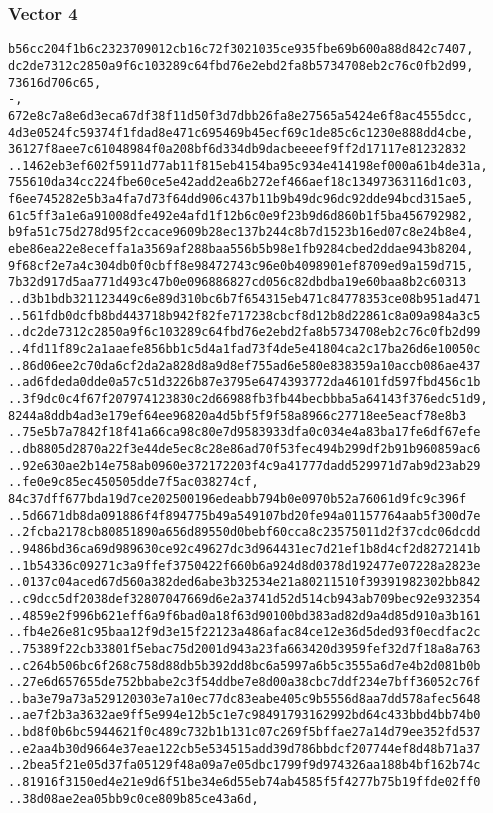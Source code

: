 \documentclass[
]{article}
\begin{document}
\hypertarget{vector-4-2}{%
\subsubsection{Vector 4}\label{vector-4-2}}

\begin{verbatim}
b56cc204f1b6c2323709012cb16c72f3021035ce935fbe69b600a88d842c7407,
dc2de7312c2850a9f6c103289c64fbd76e2ebd2fa8b5734708eb2c76c0fb2d99,
73616d706c65,
-,
672e8c7a8e6d3eca67df38f11d50f3d7dbb26fa8e27565a5424e6f8ac4555dcc,
4d3e0524fc59374f1fdad8e471c695469b45ecf69c1de85c6c1230e888dd4cbe,
36127f8aee7c61048984f0a208bf6d334db9dacbeeeef9ff2d17117e81232832
..1462eb3ef602f5911d77ab11f815eb4154ba95c934e414198ef000a61b4de31a,
755610da34cc224fbe60ce5e42add2ea6b272ef466aef18c13497363116d1c03,
f6ee745282e5b3a4fa7d73f64dd906c437b11b9b49dc96dc92dde94bcd315ae5,
61c5ff3a1e6a91008dfe492e4afd1f12b6c0e9f23b9d6d860b1f5ba456792982,
b9fa51c75d278d95f2ccace9609b28ec137b244c8b7d1523b16ed07c8e24b8e4,
ebe86ea22e8eceffa1a3569af288baa556b5b98e1fb9284cbed2ddae943b8204,
9f68cf2e7a4c304db0f0cbff8e98472743c96e0b4098901ef8709ed9a159d715,
7b32d917d5aa771d493c47b0e096886827cd056c82dbdba19e60baa8b2c60313
..d3b1bdb321123449c6e89d310bc6b7f654315eb471c84778353ce08b951ad471
..561fdb0dcfb8bd443718b942f82fe717238cbcf8d12b8d22861c8a09a984a3c5
..dc2de7312c2850a9f6c103289c64fbd76e2ebd2fa8b5734708eb2c76c0fb2d99
..4fd11f89c2a1aaefe856bb1c5d4a1fad73f4de5e41804ca2c17ba26d6e10050c
..86d06ee2c70da6cf2da2a828d8a9d8ef755ad6e580e838359a10accb086ae437
..ad6fdeda0dde0a57c51d3226b87e3795e6474393772da46101fd597fbd456c1b
..3f9dc0c4f67f207974123830c2d66988fb3fb44becbbba5a64143f376edc51d9,
8244a8ddb4ad3e179ef64ee96820a4d5bf5f9f58a8966c27718ee5eacf78e8b3
..75e5b7a7842f18f41a66ca98c80e7d9583933dfa0c034e4a83ba17fe6df67efe
..db8805d2870a22f3e44de5ec8c28e86ad70f53fec494b299df2b91b960859ac6
..92e630ae2b14e758ab0960e372172203f4c9a41777dadd529971d7ab9d23ab29
..fe0e9c85ec450505dde7f5ac038274cf,
84c37dff677bda19d7ce202500196edeabb794b0e0970b52a76061d9fc9c396f
..5d6671db8da091886f4f894775b49a549107bd20fe94a01157764aab5f300d7e
..2fcba2178cb80851890a656d89550d0bebf60cca8c23575011d2f37cdc06dcdd
..9486bd36ca69d989630ce92c49627dc3d964431ec7d21ef1b8d4cf2d8272141b
..1b54336c09271c3a9ffef3750422f660b6a924d8d0378d192477e07228a2823e
..0137c04aced67d560a382ded6abe3b32534e21a80211510f39391982302bb842
..c9dcc5df2038def32807047669d6e2a3741d52d514cb943ab709bec92e932354
..4859e2f996b621eff6a9f6bad0a18f63d90100bd383ad82d9a4d85d910a3b161
..fb4e26e81c95baa12f9d3e15f22123a486afac84ce12e36d5ded93f0ecdfac2c
..75389f22cb33801f5ebac75d2001d943a23fa663420d3959fef32d7f18a8a763
..c264b506bc6f268c758d88db5b392dd8bc6a5997a6b5c3555a6d7e4b2d081b0b
..27e6d657655de752bbabe2c3f54ddbe7e8d00a38cbc7ddf234e7bff36052c76f
..ba3e79a73a529120303e7a10ec77dc83eabe405c9b5556d8aa7dd578afec5648
..ae7f2b3a3632ae9ff5e994e12b5c1e7c98491793162992bd64c433bbd4bb74b0
..bd8f0b6bc5944621f0c489c732b1b131c07c269f5bffae27a14d79ee352fd537
..e2aa4b30d9664e37eae122cb5e534515add39d786bbdcf207744ef8d48b71a37
..2bea5f21e05d37fa05129f48a09a7e05dbc1799f9d974326aa188b4bf162b74c
..81916f3150ed4e21e9d6f51be34e6d55eb74ab4585f5f4277b75b19ffde02ff0
..38d08ae2ea05bb9c0ce809b85ce43a6d,
\end{verbatim}
\end{document}
